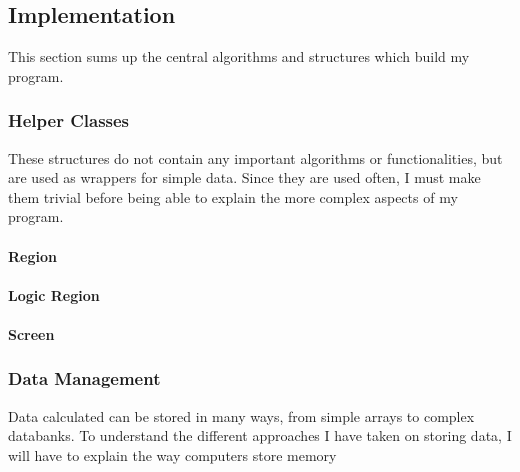 \documentclass[10pt,a4paper,titlepage]{article}
\begin{document}
	\subsection{Implementation}
	This section sums up the central algorithms and structures which build my program.
	\subsubsection{Helper Classes}
	These structures do not contain any important algorithms or functionalities, but are used as wrappers for simple data. Since they are used often, I must make them trivial before being able to explain the more complex aspects of my program.
	\paragraph{Region}
	\paragraph{Logic Region}
	\paragraph{Screen}
	\subsubsection{Data Management}
	Data calculated can be stored in many ways, from simple arrays to complex databanks. To understand the different approaches I have taken on storing data, I will have to explain the way computers store memory
\end{document}
